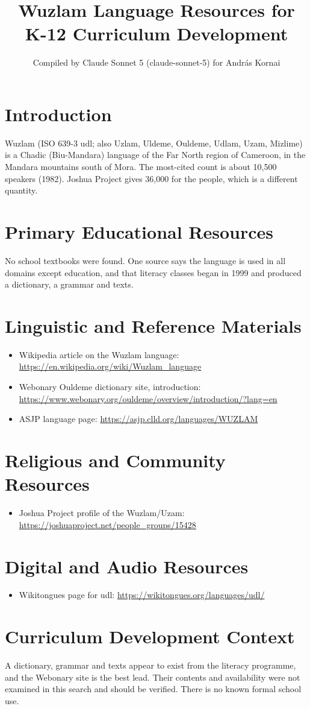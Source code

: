 \documentclass[12pt]{article}
\title{Wuzlam Language Resources for K-12 Curriculum Development}
\author{Compiled by Claude Sonnet 5 (claude-sonnet-5) for Andr\'as Kornai}
\date{}
\begin{document}
\maketitle
\section{Introduction}
Wuzlam (ISO 639-3 udl; also Uzlam, Uldeme, Ouldeme, Udlam, Uzam, Mizlime) is a Chadic (Biu-Mandara) language of the Far North region of Cameroon, in the Mandara mountains south of Mora. The most-cited count is about 10,500 speakers (1982). Joshua Project gives 36,000 for the people, which is a different quantity.
\section{Primary Educational Resources}
No school textbooks were found. One source says the language is used in all domains except education, and that literacy classes began in 1999 and produced a dictionary, a grammar and texts.
\section{Linguistic and Reference Materials}
\begin{itemize}
\item Wikipedia article on the Wuzlam language: \url{https://en.wikipedia.org/wiki/Wuzlam_language}
\item Webonary Ouldeme dictionary site, introduction: \url{https://www.webonary.org/ouldeme/overview/introduction/?lang=en}
\item ASJP language page: \url{https://asjp.clld.org/languages/WUZLAM}
\end{itemize}
\section{Religious and Community Resources}
\begin{itemize}
\item Joshua Project profile of the Wuzlam/Uzam: \url{https://joshuaproject.net/people_groups/15428}
\end{itemize}
\section{Digital and Audio Resources}
\begin{itemize}
\item Wikitongues page for udl: \url{https://wikitongues.org/languages/udl/}
\end{itemize}
\section{Curriculum Development Context}
A dictionary, grammar and texts appear to exist from the literacy programme, and the Webonary site is the best lead. Their contents and availability were not examined in this search and should be verified. There is no known formal school use.
\end{document}
